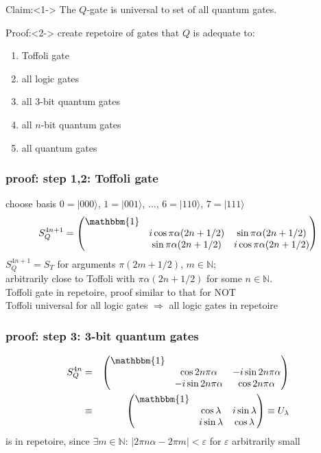 \documentclass{beamer}
\begin{document}
\begin{frame}
    \begin{block}{Claim:}<1->
		The $Q$-gate is universal to set of all quantum gates.
	\end{block}
    \begin{block}{Proof:}<2->
     	create repetoire of gates that $Q$ is adequate to:
	    	\begin{enumerate}
    	    	\item Toffoli gate
        		\item all logic gates
        		\item all $3$-bit quantum gates
        		\item all $n$-bit quantum gates
        		\item all quantum gates
    		\end{enumerate}
    \end{block}
\end{frame}
\begin{frame}
	\frametitle{proof: step 1,2: Toffoli gate}
    choose basis
    $0=|000\rangle$, $1=|001\rangle$, $\ldots$, $6=|110\rangle$, $7=|111\rangle$
    \begin{equation*}
        S_Q^{4n+1}=\begin{pmatrix}
			\mathbbm{1}&&\\
            &i\cos\pi\alpha (2n+1/2)&\sin\pi\alpha (2n+1/2)\\
            &\sin\pi\alpha(2n+1/2)&i\cos\pi\alpha(2n+1/2)
        \end{pmatrix}
    \end{equation*}
    $S_Q^{4n+1}=S_T$ for arguments $\pi(2m+1/2)$, $m\in\mathbb{N}$;\\
    arbitrarily close to Toffoli with $\pi\alpha(2n+1/2)$ for some $n\in\mathbb{N}$.\\
    Toffoli gate in repetoire, proof similar to that for NOT\\
    Toffoli universal for all logic gates $\Rightarrow$ all logic gates in repetoire
\end{frame}
\begin{frame}
	\frametitle{proof: step 3: 3-bit quantum gates}
    \begin{eqnarray*}
        S_Q^{4n}&=&\begin{pmatrix}\mathbbm{1}&&\\
            &\cos 2n\pi\alpha&-i\sin2n\pi\alpha\\
            &-i\sin2n\pi\alpha&\cos2n\pi\alpha
        \end{pmatrix}\\
        &\equiv&\begin{pmatrix}\mathbbm{1}&&\\
            &\cos \lambda&i\sin\lambda\\
            &i\sin\lambda&\cos\lambda
        \end{pmatrix}\equiv U_\lambda
    \end{eqnarray*}
    is in repetoire, since $\exists m\in\mathbb{N}:\,|2\pi n\alpha-2\pi m|<\varepsilon$ for $\varepsilon$ arbitrarily small
\end{frame}
\end{document}

